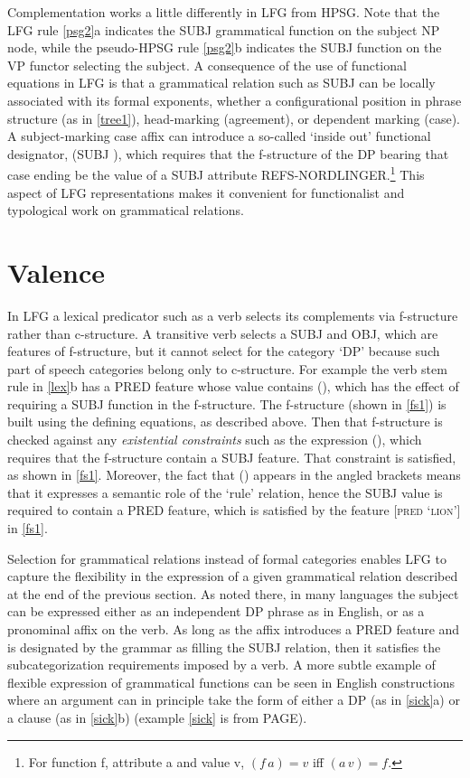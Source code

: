 \documentclass[output=paper
                ,modfonts
                ,nonflat
	        ,collection
	        ,collectionchapter
	        ,collectiontoclongg
 	        ,biblatex
                ,babelshorthands
                ,newtxmath
                ,draftmode
                ,colorlinks, citecolor=brown
]{./langsci/langscibook}
\begin{document}
Complementation works a little differently in LFG from HPSG.  Note that the LFG  rule \ref{psg2}a indicates the SUBJ grammatical function on the subject NP node, while the pseudo-HPSG rule \ref{psg2}b indicates the SUBJ function on the VP functor selecting the subject.   A consequence of the use of functional equations in LFG is that a grammatical relation such as SUBJ can be locally associated with its formal exponents, whether a configurational position in phrase structure (as in \ref{tree1}), head-marking (agreement), or dependent marking (case).  A subject-marking case affix can introduce a so-called `inside out' functional designator, (SUBJ \up), which requires that the f-structure of the DP bearing that case ending be the value of a SUBJ attribute REFS-NORDLINGER.\footnote{For function f, attribute a and value v, $(f \, a) = v$ iff $(a \, v) = f$.}  This aspect of LFG representations makes it convenient for functionalist and typological work on grammatical relations.  


 
\section{Valence} 
\label{valence-sec}
In LFG a lexical predicator such as a verb selects its complements via f-structure rather than c-structure.  A transitive verb selects a SUBJ and OBJ, which are features of f-structure, but it cannot select for the category `DP' because such part of speech categories belong only to c-structure.  For example the verb stem rule in \ref{lex}b has a PRED feature whose value contains (\up {}), which has the effect of requiring a SUBJ function in the f-structure.    The f-structure (shown in \ref{fs1}) is built using the defining equations, as described above.  Then that f-structure is checked against any \textit{existential constraints} such as  the expression (\up {}), which requires that the f-structure contain a SUBJ feature.  That constraint is satisfied, as shown in \ref{fs1}.  Moreover, the fact that (\up {}) appears in the angled brackets means that it expresses a semantic role of the `rule' relation, hence the SUBJ value is required to contain a PRED feature, which is satisfied by the feature [\textsc{pred} `\textsc{lion}'] in  \ref{fs1}.  

Selection for grammatical relations instead of formal categories enables LFG to capture the  flexibility in the expression of a given grammatical relation described at the end of the previous section.  As noted there, in many languages the subject can be expressed either as an independent DP phrase as in English, or as a pronominal affix on the verb.  As long as the affix introduces a PRED feature and is designated by the grammar as filling the SUBJ relation, then it satisfies the subcategorization requirements imposed by a verb.  A more subtle example of flexible expression of grammatical functions  can be seen in English constructions where an argument can in principle take the form of either a DP (as in \ref{sick}a) or a clause (as in \ref{sick}b) (example \ref{sick} is from \cite{BATW2015a} PAGE).  
\end{document}
